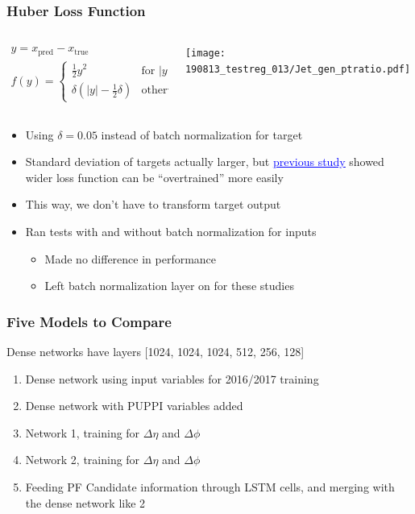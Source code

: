 \documentclass{beamer}
\newcommand{\link}[2]{\href{#2}{\textcolor{blue}{\underline{#1}}}}
\begin{document}
\begin{frame}
  \frametitle{Huber Loss Function}

  \begin{columns}
    \begin{column}{0.5\linewidth}
      \begin{gather*}
        y = x_\mathrm{pred} - x_\mathrm{true} \\
        f(y) = \begin{cases}
          \frac12 y^2 & \mbox{for } |y| < \delta \\
          \delta(|y| - \frac12 \delta) & \mbox{otherwise}
        \end{cases}
      \end{gather*}
    \end{column}
    \begin{column}{0.5\linewidth}
      \texttt{[image: 190813\_testreg\_013/Jet\_gen\_ptratio.pdf]}
    \end{column}
  \end{columns}

  \begin{itemize}
  \item Using $\delta = 0.05$ instead of batch normalization for target
  \item Standard deviation of targets actually larger, but
    \link{previous study}{http://t3serv001.mit.edu/~dabercro/docs/hbb/dabercro_hbb_190611.pdf}
    showed wider loss function can be ``overtrained''
    more easily
  \item This way, we don't have to transform target output
  \item Ran tests with and without batch normalization for inputs
    \begin{itemize}
    \item Made no difference in performance
    \item Left batch normalization layer on for these studies
    \end{itemize}
  \end{itemize}

\end{frame}

\begin{frame}
  \frametitle{Five Models to Compare}

  Dense networks have layers [1024, 1024, 1024, 512, 256, 128]

  \begin{enumerate}
  \item Dense network using input variables for 2016/2017 training
  \item Dense network with PUPPI variables added
  \item Network 1, training for $\Delta \eta$ and $\Delta \phi$
  \item Network 2, training for $\Delta \eta$ and $\Delta \phi$
  \item Feeding PF Candidate information through LSTM cells,
    and merging with the dense network like 2
  \end{enumerate}

\end{frame}
\end{document}
